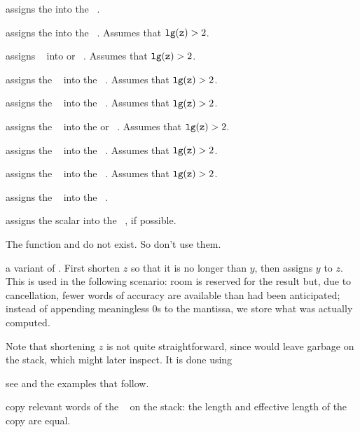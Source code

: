  assigns the   into the
~.

 assigns the   into the
~. Assumes that ${\tt lg(z)} > 2$.

 assigns ~ into  or
~. Assumes that ${\tt lg(z)} > 2$.

 assigns the ~ into the
~. Assumes that ${\tt lg(z)} > 2$.

 assigns the ~ into the
~. Assumes that ${\tt lg(z)} > 2$.

 assigns the ~ into the
 or ~. Assumes that ${\tt lg(z)} > 2$.

 assigns the ~ into the
~. Assumes that ${\tt lg(z)} > 2$.

 assigns the ~ into the
~. Assumes that ${\tt lg(z)} > 2$.

 assigns the ~ into the
~.

 assigns the scalar  into the
~, if possible.

\noindent The function  and  do not exist. So don't use
them.

 a variant of . First shorten
$z$ so that it is no longer than $y$, then assigns $y$ to $z$. This is used
in the following scenario: room is reserved for the result but, due to
cancellation, fewer words of accuracy are available than had been
anticipated; instead of appending meaningless $0$s to the mantissa, we store
what was actually computed.

Note that shortening $z$ is not quite straightforward, since 
would leave garbage on the stack, which  might later inspect.
It is done using

 see  and the examples that
follow.


 copy relevant words of the ~ on the
stack: the length and effective length of the copy are equal.

